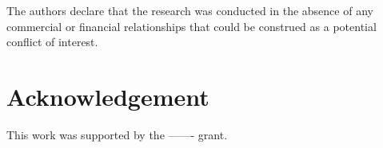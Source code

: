 \documentclass{frontiersSCNS} %
\begin{document}
The authors declare that the research was conducted in the absence of any commercial or financial relationships that could be construed as a potential conflict of interest.

%

\section*{Acknowledgement}
This work was supported by the ------- grant.





\end{document}
